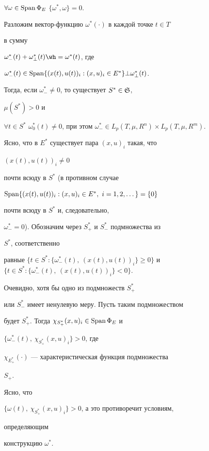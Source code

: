 \begin{pf}
$\forall\omega\in\operatorname{Span}\Phi_E$\; $\{\omega^*,\omega\}=0$. 


Разложим вектор-функцию $\omega^*(\cdot)$ в каждой точке $t\in T$ 


в сумму 


$\omega^*_-(t)+\omega^*_\bot(t)\wh =\omega^*(t)$, где 


$\omega^*_-(t)\in\Span\{(x(t),u(t))_i:(x,u)_i\in E^*\}\bot 


\omega^*_\bot(t)$. 


Тогда, если $\omega^*_-\ne0$, то существует $S^*\in\frak S$, 


$\mu(S^*)>0$ и 


$\forall t\in S^*$\; $\omega^*_0(t)\ne0$, при этом $\omega^*_-\in 


L_p(T,\mu,R^n)\times L_p(T,\mu,R^m)$. 


 


Ясно, что в $E^*$ существует пара $(x,u)_i$ такая, что 


$(x(t),u(t))_i\ne0$ 


почти всюду в $S^*$ (в противном случае 


$\Span\{(x(t),u(t))_i:(x,u)_i\in E^*,\ i=1,2,\dotsc\}=\{0\}$ 


почти всюду в $S^*$ и, следовательно, 


$\omega^*_-=0$). Обозначим через $S^*_+$ и $S^*_-$ подмножества из 


$S^*$, соответственно 


равные $\{t\in S^*:\{\omega^*_-(t),\ (x(t),u(t))_i\}\ge0\}$ и $\{t\in 


S^*:\{\omega^*_-(t),\ (x(t),u(t))_i\}<0\}$. 


Очевидно, хотя бы одно из подмножеств $S^*_+$ 


или $S^*_-$ имеет ненулевую меру. Пусть таким подмножеством 


будет $S^*_+$. Тогда $\chi_{S^*_+}(x,u)_i\in\operatorname{Span}\Phi_E$ и 


$\{\omega^*_-(t),\ \chi_{S^*_+}(x,u)_i\}>0$, где 


$\chi_{E^*_+}(\cdot)$ --- характеристическая функция подмножества 


$S_+$. 


Ясно, что 


$\{\omega(t),\ \chi_{S^*_+}(x,u)_i\}>0$, а это противоречит условиям, 


определяющим 


конструкцию $\omega^*$. 


\end{pf} 


